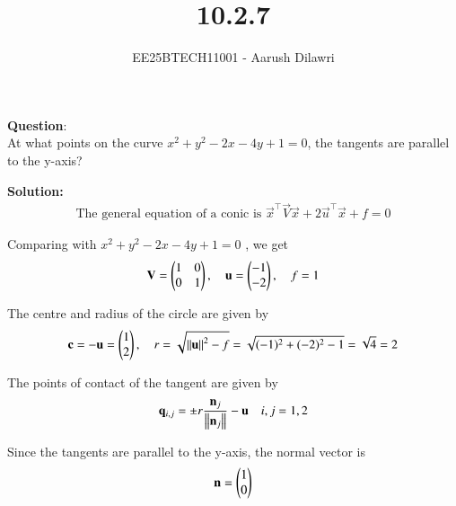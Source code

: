 \documentclass[journal]{IEEEtran}
\begin{document}

\vspace{3cm}

\title{10.2.7}
\author{EE25BTECH11001 - Aarush Dilawri}
\maketitle
{\let\newpage\relax\maketitle}

\renewcommand{\thefigure}{\theenumi}
\renewcommand{\thetable}{\theenumi}
\setlength{\intextsep}{10pt} %

\renewcommand{\thetable}{\theenumi}

\textbf{Question}:\\
At what points on the curve $x^2 + y^2 - 2x - 4y + 1 = 0$, the tangents are parallel to
the y-axis?

\textbf{Solution:}\\

\begin{align}
\text{The general equation of a conic is } 
\vec{x}^\top\vec{V}\vec{x} + 2\vec{u}^\top\vec{x} + f = 0
\end{align}

Comparing with $x^2 + y^2 - 2x - 4y + 1 = 0$ , we get
\begin{align}
\mathbf{V} = \begin{pmatrix}1 & 0 \\ 0 & 1\end{pmatrix},\quad
\mathbf{u} = \begin{pmatrix}-1 \\ -2\end{pmatrix},\quad
f = 1
\end{align}

The centre and radius of the circle are given by
\begin{align}
\mathbf{c} = -\mathbf{u} = \begin{pmatrix}1 \\ 2\end{pmatrix},\quad
r = \sqrt{\left\lVert\mathbf{u}\right\rVert^2 - f} 
= \sqrt{(-1)^2 + (-2)^2 - 1} 
= \sqrt{4} = 2
\end{align}

The points of contact of the tangent are given by
\begin{align}
\mathbf{q}_{i,j} = \pm r\frac{\mathbf{n}_j}{\left\lVert\mathbf{n}_j\right\rVert} - \mathbf{u} \quad i,j = 1,2
\end{align}

Since the tangents are parallel to the y-axis, the normal vector is
\begin{align}
\mathbf{n} = \begin{pmatrix}1 \\ 0\end{pmatrix}
\end{align}
\end{document}
